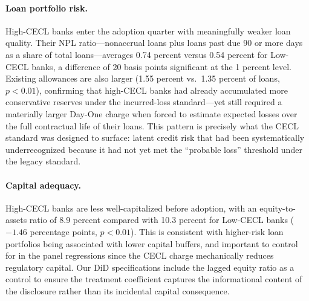 \paragraph{Loan portfolio risk.}
High-CECL banks enter the adoption quarter with meaningfully weaker loan
quality. Their NPL ratio---nonaccrual loans plus loans past due 90 or more days
as a share of total loans---averages 0.74 percent versus 0.54 percent for Low-CECL
banks, a difference of 20 basis points significant at the 1 percent level.
Existing allowances are also larger (1.55 percent vs.\ 1.35 percent of loans,
$p < 0.01$), confirming that high-CECL banks had already accumulated more
conservative reserves under the incurred-loss standard---yet still required a
materially larger Day-One charge when forced to estimate expected losses over the
full contractual life of their loans. This pattern is precisely what the CECL
standard was designed to surface: latent credit risk that had been
systematically underrecognized because it had not yet met the ``probable loss''
threshold under the legacy standard.

\paragraph{Capital adequacy.}
High-CECL banks are less well-capitalized before adoption, with an
equity-to-assets ratio of 8.9 percent compared with 10.3 percent for Low-CECL
banks ($-1.46$ percentage points, $p < 0.01$). This is consistent with
higher-risk loan portfolios being associated with lower capital buffers, and
important to control for in the panel regressions since the CECL charge
mechanically reduces regulatory capital. Our DiD specifications include the
lagged equity ratio as a control to ensure the treatment coefficient captures
the informational content of the disclosure rather than its incidental capital
consequence.

